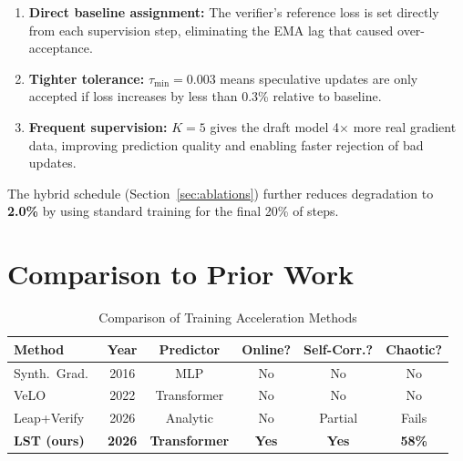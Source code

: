 \documentclass[conference]{IEEEtran}
\begin{document}
\begin{enumerate}
    \item \textbf{Direct baseline assignment:} The verifier's reference loss is set directly from each supervision step, eliminating the EMA lag that caused over-acceptance.
    \item \textbf{Tighter tolerance:} $\tau_{\min}{=}0.003$ means speculative updates are only accepted if loss increases by less than 0.3\% relative to baseline.
    \item \textbf{Frequent supervision:} $K{=}5$ gives the draft model 4$\times$ more real gradient data, improving prediction quality and enabling faster rejection of bad updates.
\end{enumerate}

The hybrid schedule (Section~\ref{sec:ablations}) further reduces degradation to \textbf{2.0\%} by using standard training for the final 20\% of steps.

\section{Comparison to Prior Work}

\begin{table}[h]
\centering
\caption{Comparison of Training Acceleration Methods}
\label{tab:comparison}
\begin{tabular}{@{}lccccc@{}}
\toprule
\textbf{Method} & \textbf{Year} & \textbf{Predictor} & \textbf{Online?} & \textbf{Self-Corr.?} & \textbf{Chaotic?} \\
\midrule
Synth.\ Grad.~\cite{jaderberg2017decoupled} & 2016 & MLP & No & No & No \\
VeLO~\cite{metz2022velo} & 2022 & Transformer & No & No & No \\
Leap+Verify~\cite{leapverify2026} & 2026 & Analytic & No & Partial & Fails \\
\textbf{LST (ours)} & \textbf{2026} & \textbf{Transformer} & \textbf{Yes} & \textbf{Yes} & \textbf{58\%} \\
\bottomrule
\end{tabular}
\end{table}
\end{document}
